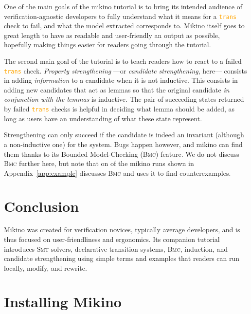 \documentclass{easychair}
\newcommand{\Mkn}{Mikino}
\newcommand{\mkn}{mikino}
\newcommand{\smt}{\textsc{Smt}}
\newcommand{\bmc}{\textsc{Bmc}}
\newcommand{\ita}[1]{\textit{#1}}
\newcommand{\code}[1]{\textcolor{orange}{\texttt{#1}}}
\newcommand{\appref}[1]{Appendix~\ref{#1}}
\newcommand{\trans}{\code{trans}}
\begin{document}
\smallskip{}

One of the main goals of the \mkn{} tutorial is to bring its intended audience of
verification-agnostic developers to fully understand what it means for a \trans{} check to fail,
and what the model extracted corresponds to. \Mkn{} itself goes to great length to have as readable
and user-friendly an output as possible, hopefully making things easier for readers going through
the tutorial.

The second main goal of the tutorial is to teach readers how to react to a failed \trans{} check.
\ita{Property strengthening} ---or \ita{candidate strengthening}, here--- consists in adding
\ita{information} to a candidate when it is not inductive. This consists in adding new candidates
that act as lemmas so that the original candidate \ita{in conjunction with the lemmas} is
inductive. The pair of succeeding states returned by failed \trans{} checks is helpful in deciding
what lemma should be added, as long as users have an understanding of what these state represent.

Strengthening can only succeed if the candidate is indeed an invariant (although a non-inductive
one) for the system. Bugs happen however, and \mkn{} can find them thanks to its Bounded
Model-Checking (\bmc{}) feature. We do not discuss \bmc{} further here, but note that on of the
\mkn{} runs shown in \appref{app:example} discusses \bmc{} and uses it to find counterexamples.


\section{Conclusion}%
\label{sec:conclusion}

\Mkn{} was created for verification novices, typically average developers, and is thus focused on
user-friendliness and ergonomics. Its companion tutorial introduces \smt{} solvers, declarative
transition systems, \bmc{}, induction, and candidate strengthening using simple terms and examples
that readers can run locally, modify, and rewrite.


\newpage{}

\label{sec:bib}%

%
%
%


\newpage{}

\appendix

\section{Installing \Mkn{}}%
\label{app:install}
\end{document}
